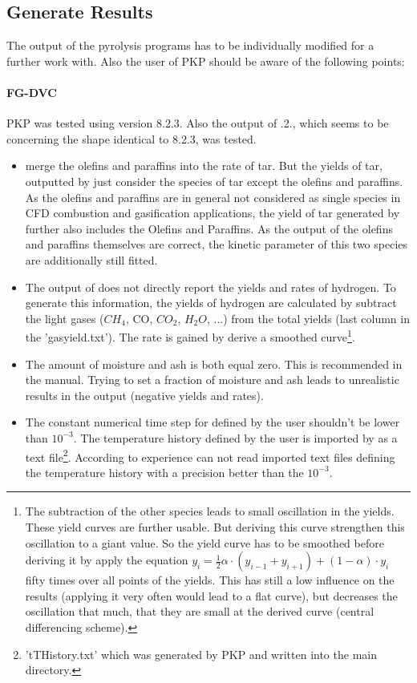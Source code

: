 \subsection{Generate Results}\label{SS_Generate_Results}
The output of the pyrolysis programs has to be individually modified for a further work with. Also the user of PKP should be aware of the following points:
\paragraph{FG-DVC}
PKP was tested using \FGDVC version 8.2.3. Also the output of .2., which seems to be concerning the shape identical to 8.2.3, was tested.
\begin{itemize}
 \item \FGDVC merge the olefins and paraffins into the rate of tar. But the yields of tar, outputted by \FGDVC just consider the species of tar except the olefins and paraffins. As the olefins and paraffins are in general not considered as single species in CFD combustion and gasification applications, the yield of tar generated by \FGDVC further also includes the Olefins and Paraffins. As the output of the olefins and paraffins themselves are correct, the kinetic parameter of this two species are additionally still fitted.
 \item The output of \FGDVC does not directly report the yields and rates of hydrogen. To generate this information, the yields of hydrogen are calculated by subtract the light gases ($CH_4$, CO, $CO_2$, $H_2O$, ...) from the total yields (last column in the 'gasyield.txt'). The rate is gained by derive a smoothed curve\footnote{The subtraction of the other species leads to small oscillation in the yields. These yield curves are further usable. But deriving this curve strengthen this oscillation to a giant value. So the yield curve has to be smoothed before deriving it by apply the equation $y_i=\frac{1}{2} \alpha \cdot (y_{i-1}+y_{i+1})+(1-\alpha) \cdot y_i$ fifty times over all points of the yields. This has still a low influence on the results (applying it very often would lead to a flat curve), but decreases the oscillation that much, that they are small at the derived curve (central differencing scheme).}.
 \item The amount of moisture and ash is both equal zero. This is recommended in the manual. Trying to set a fraction of moisture and ash leads to unrealistic results in the \FGDVC output (negative yields and rates).
 \item The constant numerical time step for \FGDVC defined by the user shouldn't be lower than $10^{-3}$. The temperature history defined by the user is imported by \FGDVC as a text file\footnote{'tTHistory.txt' which was generated by PKP and written into the \FGDVC main directory.}. According to experience can \FGDVC not read imported text files defining the temperature history with a precision better than the $10^{-3}$.
\end{itemize}

